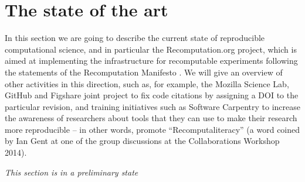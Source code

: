 \section{The state of the art}
\label{s:recomputation}

In this section we are going to describe the current state of reproducible computational science, and
in particular the Recomputation.org project, which is aimed at implementing
the infrastructure for recomputable experiments following the statements of the Recomputation
Manifesto \cite{gent:recomputation}. We will give an overview of other activities in this
direction, such as, for example, the Mozilla Science Lab, GitHub and Figshare joint project to fix code
citations by assigning a DOI to the particular revision, and training initiatives such as Software
Carpentry to increase the awareness of researchers about tools that they can use to make their
research more reproducible -- in other words, promote ``Recomputaliteracy'' (a word coined by 
Ian Gent at one of the group discussions at the Collaborations Workshop 2014).

\emph{This section is in a preliminary state}

